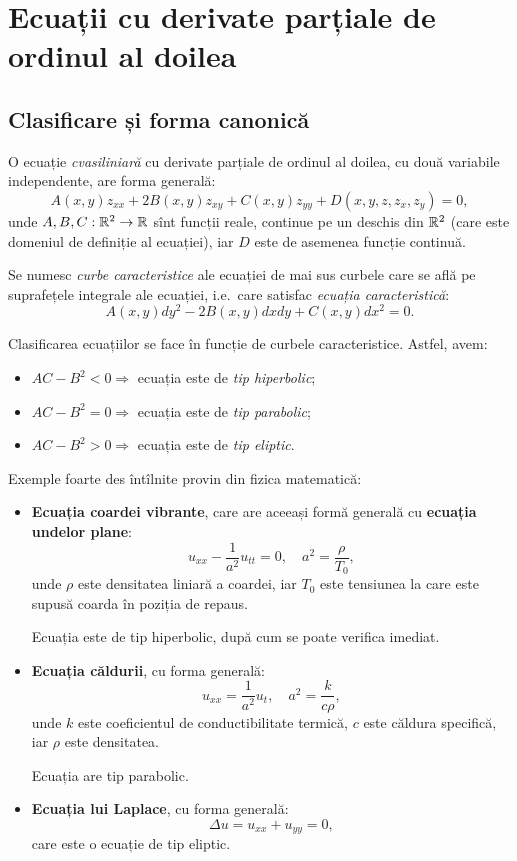 \chapter{Ecuații cu derivate parțiale de ordinul al doilea}

\section{Clasificare și forma canonică}
O ecuație \emph{cvasiliniară} cu derivate parțiale de ordinul al doilea,
cu două variabile independente, are forma generală:
\[
  A(x, y) z_{xx} + 2B(x, y) z_{xy} + C(x, y) z_{yy} + D(x, y, z, z_x, z_y) = 0,
\]
unde $ A, B, C : \mathbb{R}^2 \to \mathbb{R}$ sînt funcții reale, continue pe un deschis
din $ \mathbb{R}^2 $ (care este domeniul de definiție al ecuației), iar $ D $ este
de asemenea funcție continuă.
\begin{definition}\label{def:curbe-car}
  Se numesc \emph{curbe caracteristice} ale ecuației de mai sus curbele care se
  află pe suprafețele integrale ale ecuației, i.e.\ care satisfac
  \emph{ecuația caracteristică}:
  \[
    A(x, y) dy^2 - 2B(x, y) dxdy + C(x, y) dx^2 = 0.
  \]
\end{definition}

Clasificarea ecuațiilor se face în funcție de curbele caracteristice.
Astfel, avem:
\begin{itemize}
\item $ AC - B^2 < 0 \Rightarrow $ ecuația este de \emph{tip hiperbolic};
\item $ AC - B^2 = 0 \Rightarrow $ ecuația este de \emph{tip parabolic};
\item $ AC - B^2 > 0 \Rightarrow $ ecuația este de \emph{tip eliptic}.
\end{itemize}

Exemple foarte des întîlnite provin din fizica matematică:
\begin{itemize}
\item \textbf{Ecuația coardei vibrante}, care are aceeași formă generală
  cu \textbf{ecuația undelor plane}:  
  \[
    u_{xx} - \dfrac{1}{a^2} u_{tt} = 0, \quad a^2 = \dfrac{\rho}{T_0},
  \]
  unde $ \rho $ este densitatea liniară a coardei, iar $ T_0 $ este tensiunea
  la care este supusă coarda în poziția de repaus.

  Ecuația este de tip hiperbolic, după cum se poate verifica imediat.
\item \textbf{Ecuația căldurii}, cu forma generală: 
  \[
    u_{xx} = \dfrac{1}{a^2} u_t, \quad a^2 = \dfrac{k}{c \rho},
  \]
  unde $ k $ este coeficientul de conductibilitate termică, $ c $ este
  căldura specifică, iar $ \rho $ este densitatea.

  Ecuația are tip parabolic.
\item \textbf{Ecuația lui Laplace}, cu forma generală: 
  \[
    \Delta u = u_{xx} + u_{yy} = 0,
  \]
  care este o ecuație de tip eliptic.
\end{itemize}

